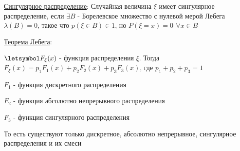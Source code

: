 \begin{enumerate}
    \hyperlink{singulardistribution}{Сингулярное распределение}: Случайная величина $\xi$ имеет сингулярное распределение, если $\exists B$ - Борелевское множество с нулевой мерой Лебега $\lambda(B) = 0$, такое что $p(\xi \in B) \in 1$, но $P(\xi = x) = 0 \ \, \forall x \in B$

    \hyperlink{lebesguetheorem}{Теорема Лебега}: 

    $\letsymbol F_\xi(x)$ - функция распределения $\xi$. Тогда $F_\xi(x) = p_1 F_1(x) + p_2 F_2(x) + p_3 F_3(x)$, где $p_1 + p_2 + p_3 = 1$

    $F_1$ - функция дискретного распределения

    $F_2$ - функция абсолютно непрерывного распределения

    $F_3$ - функция сингулярного распределения

    То есть существуют только дискретное, абсолютно непрерывное, сингулярное распределения и их смеси



\end{enumerate}
